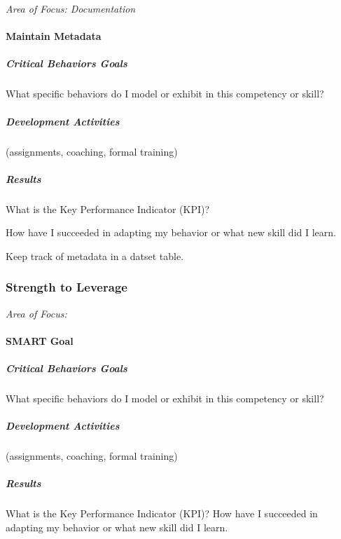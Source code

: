 \textit{Area of Focus: Documentation}
\paragraph{Maintain Metadata}
    
    
\subparagraph{Critical Behaviors Goals}

What specific behaviors do I model or exhibit in this competency or skill? 
\vspace{.3in}

\subparagraph{Development Activities}

(assignments, coaching, formal training)
\vspace{.3in}

\subparagraph{Results}

What is the Key Performance Indicator (KPI)? 

\noindent How have I succeeded in adapting my behavior or what new skill did I learn. 

\noindent Keep track of metadata in a datset table.
     
\clearpage










\subsubsection*{Strength to Leverage}
\textit{Area of Focus:}
\paragraph{SMART Goal}
    
    
\subparagraph{Critical Behaviors Goals}

What specific behaviors do I model or exhibit in this competency or skill? 
\vspace{.3in}

\subparagraph{Development Activities}

(assignments, coaching, formal training)
\vspace{.3in}

\subparagraph{Results}

What is the Key Performance Indicator (KPI)? How have I succeeded in adapting my behavior or what new skill did I learn.      
\clearpage
    
    
    
